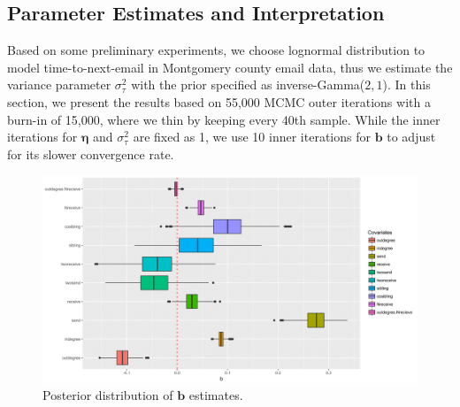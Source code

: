 \documentclass[ba]{imsart}
\numberwithin{equation}{section}
\theoremstyle{plain}
\begin{document}
	\subsection{Parameter Estimates and Interpretation}\label{subsec:Result_email}
	Based on some preliminary experiments, we choose lognormal distribution to model time-to-next-email in Montgomery county email data, thus we estimate the variance parameter $\sigma_\tau^2$ with the prior specified as inverse-Gamma($2, 1$). In this section, we present the results based on 55,000 MCMC outer iterations with a burn-in of 15,000, where we thin by keeping every 40th sample. While the inner iterations for $\boldsymbol{\eta}$ and $\sigma_\tau^2$ are fixed as 1, we use 10 inner iterations for $\boldsymbol{b}$ to adjust for its slower convergence rate.
	\begin{figure}[!b]
		\centering
		\includegraphics[width=1\textwidth]{img/best-1.png}	
		\caption {Posterior distribution of $\boldsymbol{b}$ estimates.}
		\label{figure:betaresults}
	\end{figure}
	
\end{document}
